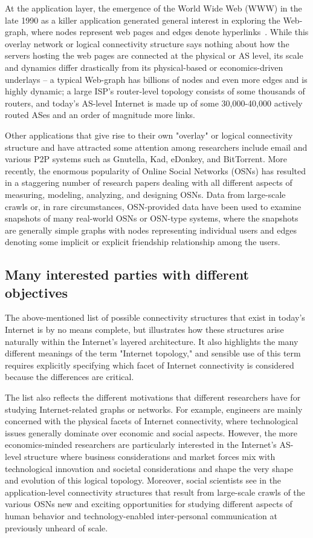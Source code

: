 \documentclass{sig-alternate-10pt}
\begin{document}
At the application layer, the emergence of the World Wide Web (WWW) in the late 1990 as a killer application generated general interest in exploring the Web-graph, where nodes represent web pages and edges denote hyperlinks~\cite{broder_etal2000}. While this overlay network or logical connectivity structure says nothing about how the servers hosting the web pages are connected at the physical or AS level, its scale and dynamics differ drastically from its physical-based or economics-driven underlays -- a typical Web-graph has billions of nodes and even more edges and is highly dynamic; a large ISP's router-level topology consists of some thousands of routers, and today's AS-level Internet is made up of some 30,000-40,000 actively routed ASes and an order of magnitude more links.

Other applications that give rise to their own "overlay" or logical connectivity structure and have attracted some attention among researchers include email and various P2P systems such as Gnutella, Kad, eDonkey, and BitTorrent.  More recently, the enormous popularity of Online Social Networks (OSNs) has resulted in a staggering number of research papers dealing with all different aspects of measuring, modeling, analyzing, and designing OSNs.  Data from large-scale crawls or, in rare circumstances, OSN-provided data have been used to examine snapshots of many real-world OSNs or OSN-type systems, where the
snapshots are generally simple graphs with nodes representing individual users and edges denoting some implicit or explicit friendship relationship among the users. 

\subsection{Many interested parties with different objectives}

The above-mentioned list of possible connectivity structures that exist in today's Internet is by no means complete, but illustrates how these structures arise naturally within the Internet's layered architecture. It also highlights the many different meanings of the term "Internet topology," and sensible use of this term requires explicitly specifying which facet of Internet connectivity is considered because the differences are critical.

The list also reflects the different motivations that different researchers have for studying Internet-related graphs or networks.  For example, engineers are mainly concerned with the
physical facets of Internet connectivity, where technological issues generally dominate over economic and social aspects.  However, the more economics-minded researchers are particularly
interested in the Internet's AS-level structure where business considerations and market forces mix with technological innovation and societal considerations and shape the very shape and evolution of this logical topology.  Moreover, social scientists see in the application-level connectivity structures that result from large-scale crawls of the various OSNs new and exciting opportunities for studying different aspects of human behavior and technology-enabled inter-personal communication at previously unheard of scale. 
\end{document}

